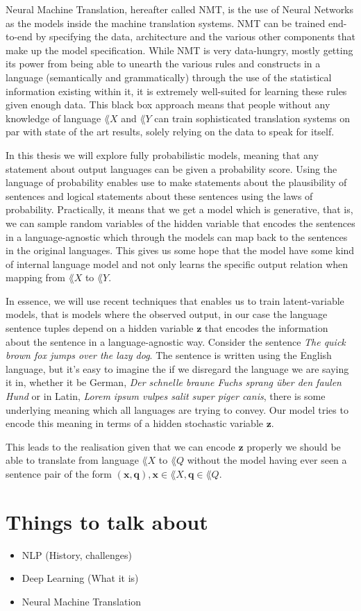 Neural Machine Translation, hereafter called NMT, is the use of Neural Networks
as the models inside 
the machine translation systems. NMT can be trained end-to-end by specifying the
data, architecture and the various other components that make up the model
specification. While NMT is very data-hungry, mostly getting its power from
being able to unearth the various rules and constructs in a language
(semantically and grammatically) through the use of the statistical information
existing within it, it is extremely well-suited for learning these rules given
enough data. This black box approach means that people without any knowledge of
language $\lang{X}$ and $\lang{Y}$ can train sophisticated translation systems
on par with state of the art results, solely relying on the data to speak for
itself.

In this thesis we will explore fully probabilistic models, meaning that any
statement about output languages can be given a probability score. Using the
language of probability enables use to make statements about the plausibility of
sentences and logical statements about these sentences using the laws of
probability. Practically, it means that we get a model which is generative, that
is, we can sample random variables of the hidden variable that encodes the
sentences in a language-agnostic which through the models can map back to the
sentences in the original languages. This gives us some hope that the model have
some kind of internal language model and not only learns the specific output
relation when mapping from $\lang{X}$ to $\lang{Y}$.

In essence, we will use recent techniques that enables us to train
latent-variable models, that is models where the observed output, in our case
the language sentence tuples depend on a hidden variable $\bm{z}$ that encodes
the information about the sentence in a language-agnostic way. Consider the
sentence \textit{The quick brown fox jumps over the lazy dog}. The sentence is
written using the English language, but it's easy to imagine the if we disregard
the language we are saying it in, whether it be German, \textit{Der schnelle
  braune Fuchs sprang über den faulen Hund} or in Latin, \textit{Lorem ipsum
  vulpes salit super piger canis}, there is some underlying meaning which all
languages are trying to convey. Our model tries to encode this meaning in terms
of a hidden stochastic variable $\bm{z}$.

This leads to the realisation given that we can encode $\bm{z}$ properly we
should be able to translate from language $\lang{X}$ to $\lang{Q}$ without the
model having ever seen a sentence pair of the form $(\bm{x}, \bm{q}), \bm{x} \in
\lang{X}, \bm{q} \in \lang{Q}$.

\section{Things to talk about}

\begin{itemize}
\item NLP (History, challenges)
\item Deep Learning (What it is)
\item Neural Machine Translation
\end{itemize}









